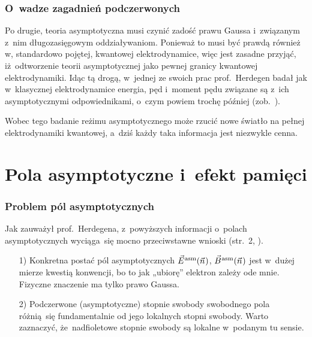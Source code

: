 \documentclass[10pt,t]{beamer}
\begin{document}
\begin{frame}
  \frametitle{O~wadze zagadnień podczerwonych}


  Po drugie, teoria asymptotyczna musi czynić zadość prawu Gaussa
  i~związanym z~nim długozasięgowym oddziaływaniom. Ponieważ to musi być
  prawdą również w, standardowo pojętej, kwantowej elektrodynamice, więc
  jest zasadne przyjąć, iż~odtworzenie teorii asymptotycznej jako pewnej
  granicy kwantowej elektrodynamiki. Idąc tą drogą, w~jednej ze swoich prac
  prof.~Herdegen badał jak w~\alert{klasycznej} elektrodynamice energia,
  pęd i~moment pędu związane są z~ich asymptotycznymi odpowiednikami,
  o~czym powiem trochę później
  (zob.~\parencite{Herdegen-Long-range-effects-in-asymptotic-ETC-Pub-1995}).

  Wobec tego badanie reżimu asymptotycznego może rzucić nowe światło
  na pełnej elektrodynamiki kwantowej, a~dziś każdy taka informacja jest
  niezwykle cenna.

\end{frame}










\section{Pola asymptotyczne i~efekt pamięci}



\begin{frame}
  \frametitle{Problem pól asymptotycznych}


  Jak zauważył prof.~Herdegena, z~powyższych informacji o~polach asymptotycznych wyciąga~się mocno przeciwstawne wnioski (str.~2,
  \parencite{Herdegen-Infrared-structure-beyond-locality-ETC-Ver-2024}).

  \begin{itemize}

  \item[1)] Konkretna postać pól asymptotycznych $\vec{E}^{ \hspace{0.05em} \text{asm} }( \vec{n} \hspace{0.05em} )$, $\vec{B}^{ \hspace{0.05em} \text{asm} }( \vec{n} \hspace{0.05em} )$
    jest w~dużej mierze kwestią konwencji, bo to jak „ubiorę” elektron
    zależy ode mnie. Fizyczne znaczenie ma tylko prawo Gaussa.

  \item[2)] Podczerwone (asymptotyczne) stopnie swobody swobodnego pola
    różnią~się fundamentalnie od jego lokalnych stopni swobody. Warto
    zaznaczyć, że~nadfioletowe stopnie swobody są lokalne w~podanym tu
    sensie.

  \end{itemize}

\end{frame}
\end{document}

